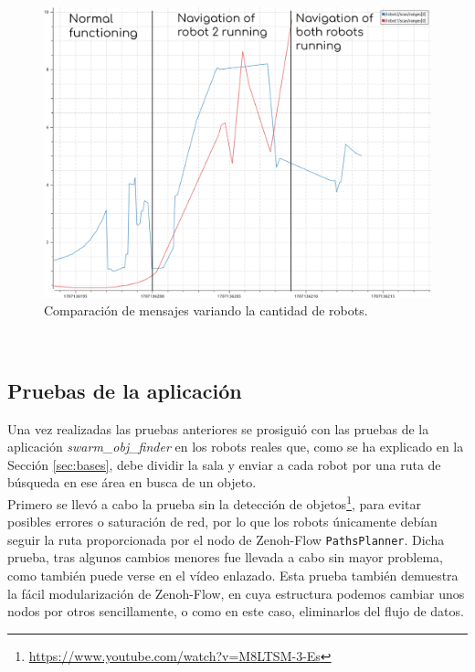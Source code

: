 \begin{figure} [h!]
  \begin{center}
    \includegraphics[width=12cm]{figs/plot_congestion_explained}
  \end{center}
  \caption{Comparación de mensajes variando la cantidad de robots.}
  \label{fig:plot_congestion}
\end{figure}\


\subsection{Pruebas de la aplicación}
\label{sec:pruebas_app}

Una vez realizadas las pruebas anteriores se prosiguió con las pruebas de la
aplicación \textit{swarm\_obj\_finder} en los robots reales que, como se ha
explicado en la Sección \ref{sec:bases}, debe dividir la sala y enviar a cada
robot por una ruta de búsqueda en ese área en busca de un objeto.
\\

Primero se llevó a cabo la prueba sin la detección de objetos\footnote{
\url{https://www.youtube.com/watch?v=M8LTSM-3-Es}}, para evitar posibles errores
o saturación de red, por lo que los robots únicamente debían seguir la ruta
proporcionada por el nodo de Zenoh-Flow \verb|PathsPlanner|.
Dicha prueba, tras algunos cambios menores fue llevada a cabo sin mayor
problema, como también puede verse en el vídeo enlazado.
Esta prueba también demuestra la fácil modularización de Zenoh-Flow, en cuya
estructura podemos cambiar unos nodos por otros sencillamente, o como en este
caso, eliminarlos del flujo de datos.
\\

